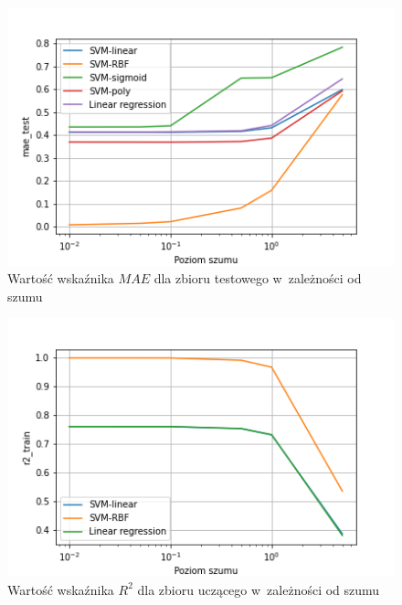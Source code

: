 \begin{figure}[h]
    \centering
    \includegraphics[width=1.1\columnwidth]{assets/mae_test.png}
    \caption{Wartość wskaźnika $MAE$ dla zbioru testowego w~zależności od szumu}
    \label{fig:noise-mae-test}
\end{figure}


\begin{figure}[h]
    \centering
    \includegraphics[width=1.1\columnwidth]{assets/r2_train.png}
    \caption{Wartość wskaźnika $R^2$ dla zbioru uczącego w~zależności od szumu}
    \label{fig:noise-r2-train}
\end{figure}

